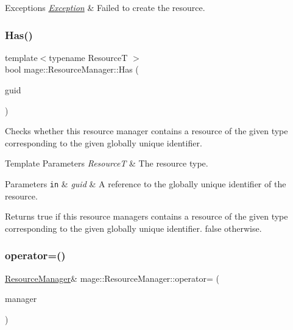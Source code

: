 \begin{DoxyExceptions}{Exceptions}
{\em \hyperlink{classmage_1_1_exception}{Exception}} & Failed to create the resource. \\
\hline
\end{DoxyExceptions}
\hypertarget{classmage_1_1_resource_manager_aa6900b8af5f17f791a551dc2d4ee35e7}{}\label{classmage_1_1_resource_manager_aa6900b8af5f17f791a551dc2d4ee35e7} 
\subsubsection{\texorpdfstring{Has()}{Has()}}
{\footnotesize\ttfamily template$<$typename ResourceT $>$ \\
bool mage\+::\+Resource\+Manager\+::\+Has (\begin{DoxyParamCaption}\item[{const wstring \&}]{guid }\end{DoxyParamCaption})\hspace{0.3cm}{\ttfamily [noexcept]}}

Checks whether this resource manager contains a resource of the given type corresponding to the given globally unique identifier.


\begin{DoxyTemplParams}{Template Parameters}
{\em ResourceT} & The resource type. \\
\hline
\end{DoxyTemplParams}

\begin{DoxyParams}[1]{Parameters}
\mbox{\tt in}  & {\em guid} & A reference to the globally unique identifier of the resource. \\
\hline
\end{DoxyParams}
\begin{DoxyReturn}{Returns}
{\ttfamily true} if this resource managers contains a resource of the given type corresponding to the given globally unique identifier. {\ttfamily false} otherwise. 
\end{DoxyReturn}
\hypertarget{classmage_1_1_resource_manager_ab0ca87429aaded525d03320dabd5cc67}{}\label{classmage_1_1_resource_manager_ab0ca87429aaded525d03320dabd5cc67} 
\subsubsection{\texorpdfstring{operator=()}{operator=()}\hspace{0.1cm}{\footnotesize\ttfamily [1/2]}}
{\footnotesize\ttfamily \hyperlink{classmage_1_1_resource_manager}{Resource\+Manager}\& mage\+::\+Resource\+Manager\+::operator= (\begin{DoxyParamCaption}\item[{const \hyperlink{classmage_1_1_resource_manager}{Resource\+Manager} \&}]{manager }\end{DoxyParamCaption})\hspace{0.3cm}{\ttfamily [delete]}}

